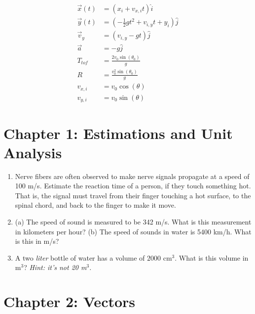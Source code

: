 \documentclass[10pt]{article}
\begin{document}
\begin{itemize}
\begin{align}
\vec{x}(t) &= (x_i + v_{x,i} t) \hat{i} \\
\vec{y}(t) &= (-\frac{1}{2}g t^2 + v_{i,y} t + y_i) \hat{j} \\
\vec{v}_y &= (v_{i,y} - g t) \hat{j} \\
\vec{a} &= -g \hat{j} \\
T_{tof} &= \frac{2 v_0\sin(\theta_0)}{g} \\
R &= \frac{v_0^2\sin(\theta_0)}{g} \\
v_{x,i} &= v_0 \cos(\theta) \\
v_{y,i} &= v_0 \sin(\theta)
\end{align}
\end{itemize}

\section{Chapter 1: Estimations and Unit Analysis}

\begin{enumerate}
\item Nerve fibers are often observed to make nerve signals propagate at a speed of 100 m/s.  Estimate the reaction time of a person, if they touch something hot.  That is, the signal must travel from their finger touching a hot surface, to the spinal chord, and back to the finger to make it move. \\ \vspace{1.5cm}
\item (a) The speed of sound is measured to be 342 m/s. What is this measurement in kilometers per hour?  (b) The speed of sounds in water is 5400 km/h.  What is this in m/s? \\ \vspace{1cm}
\item A two \textit{liter} bottle of water has a volume of $2000$ cm$^3$.  What is this volume in m$^3$?  \textit{Hint: it's not 20 m$^3$.}\\ \vspace{1cm}
\end{enumerate}

\section{Chapter 2: Vectors}
\end{document}
